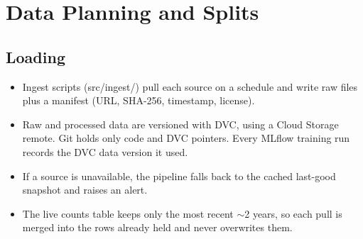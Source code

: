 \documentclass[11pt]{article}
\begin{document}
\section{Data Planning and Splits}

\subsection{Loading}
\begin{itemize}
  \item Ingest scripts (src/ingest/) pull each source on a schedule and write raw files plus a manifest (URL, SHA-256, timestamp, license).
  \item Raw and processed data are versioned with DVC, using a Cloud Storage remote. Git holds only code and DVC pointers. Every MLflow training run records the DVC data version it used.
  \item If a source is unavailable, the pipeline falls back to the cached last-good snapshot and raises an alert.
  \item The live counts table keeps only the most recent $\sim$2 years, so each pull is merged into the rows already held and never overwrites them.
\end{itemize}
\end{document}
